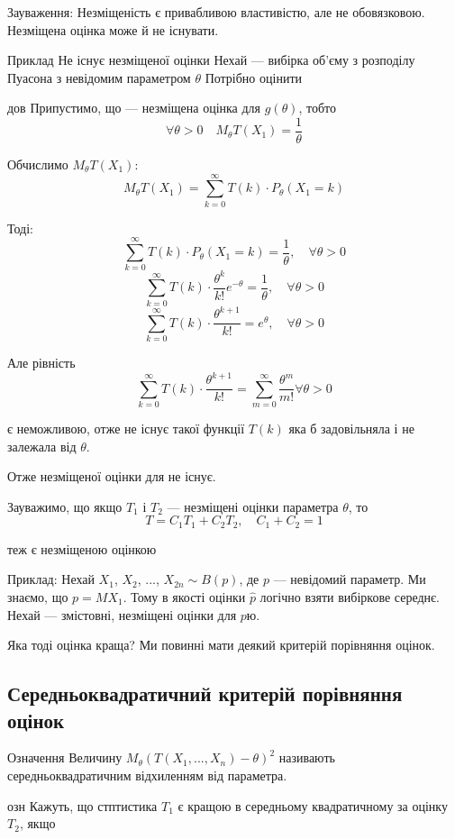 Зауваження:
Незміщеність є привабливою властивістю, але не обовязковою.
Незміщена оцінка може й не існувати.

Приклад
Не існує незміщеної оцінки
Нехай  --- вибірка об'єму  з розподілу Пуасона з невідомим
параметром $\theta$
Потрібно оцінити

дов
Припустимо, що  --- незміщена оцінка для $g(\theta)$, тобто
$$\forall \theta > 0 \quad M_{\theta} T(X_1) = \dfrac{1}{\theta}$$

Обчислимо $M_{\theta} T(X_1)$:
$$M_{\theta} T(X_1) = \sum\limits_{k=0}^{\infty} T(k) \cdot P_{\theta}(X_1 = k)$$

Тоді:
$$\sum\limits_{k=0}^{\infty} T(k) \cdot P_{\theta}(X_1 = k) = \dfrac{1}{\theta}, \quad \forall \theta > 0$$
$$\sum\limits_{k=0}^{\infty} T(k) \cdot \dfrac{\theta^k}{k!} e^{-\theta} = \dfrac{1}{\theta}, \quad \forall \theta > 0$$
$$\sum\limits_{k=0}^{\infty} T(k) \cdot \dfrac{\theta^{k+1}}{k!} = e^{\theta}, \quad \forall \theta > 0$$

Але рівність 
$$\sum\limits_{k=0}^{\infty} T(k) \cdot \dfrac{\theta^{k+1}}{k!}
= \sum\limits_{m=0}^{\infty} \dfrac{\theta^{m}}{m!} \forall \theta > 0$$

є неможливою, отже не існує такої функції $T(k)$ яка б
задовільняла  і не залежала від $\theta$.

Отже незміщеної оцінки для  не існує.

Зауважимо, що якщо $T_1$ і $T_2$ ---  незміщені
оцінки параметра $\theta$, то
$$T = C_1 T_1 + C_2 T_2, \quad C_1 + C_2 = 1$$

теж є незміщеною оцінкою

Приклад:
Нехай $X_1$, $X_2$, ..., $X_{2n} \sim B(p)$, де $p$ --- невідомий
параметр. Ми знаємо, що $p = MX_1$. Тому в якості оцінки $\hat{p}$
логічно взяти вибіркове середнє.
Нехай
--- змістовні, незміщені оцінки для $p$ю.

Яка тоді оцінка краща?
Ми повинні мати деякий критерій порівняння оцінок.
 
\subsection{Середньоквадратичний критерій порівняння оцінок}

Означення
Величину $M_{\theta}(T(X_1, ..., X_n) - \theta)^2$ називають
середньоквадратичним відхиленням від параметра.

озн
Кажуть, що стптистика $T_1$ є кращою в середньому
квадратичному за оцінку $T_2$, якщо 

